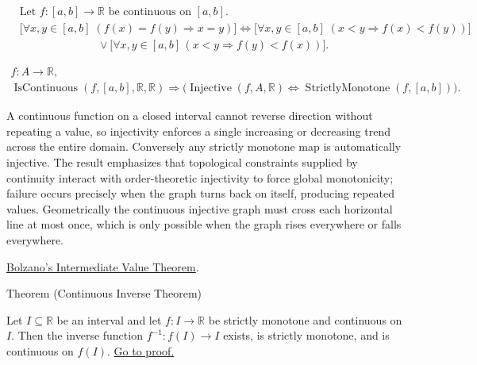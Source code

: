\begin{remark*}
\[
\begin{aligned}
&\text{Let } f:[a,b]\to\mathbb{R} \text{ be continuous on } [a,b].\\
&\bigl[\forall x,y\in[a,b]\;(f(x)=f(y)\Rightarrow x=y)\bigr] \Longleftrightarrow
\bigl[\forall x,y\in[a,b]\;(x<y\Rightarrow f(x)<f(y))\bigr]\\
&\qquad\qquad\qquad\quad\lor
\bigl[\forall x,y\in[a,b]\,(x<y\Rightarrow f(y)<f(x))\bigr].
\end{aligned}
\]
\end{remark*}

\begin{remark*}
\[
\begin{aligned}
  f\colon A\to\mathbb{R},\\
\operatorname{IsContinuous}(f,[a,b],\mathbb{R},\mathbb{R}) \Longrightarrow
\bigl(\operatorname{Injective}(f,A,\mathbb{R}) \Longleftrightarrow
\operatorname{StrictlyMonotone}(f,[a,b])\bigr).
\end{aligned}
\]
\end{remark*}

\begin{remark*}[Interpretation]
A continuous function on a closed interval cannot reverse direction without repeating a value, so injectivity enforces a single increasing or decreasing trend across the entire domain. Conversely any strictly monotone map is automatically injective. The result emphasizes that topological constraints supplied by continuity interact with order-theoretic injectivity to force global monotonicity; failure occurs precisely when the graph turns back on itself, producing repeated values. Geometrically the continuous injective graph must cross each horizontal line at most once, which is only possible when the graph rises everywhere or falls everywhere.
\end{remark*}

\begin{dependencies}
\hyperref[thm:bolzano-intermediate-value]{Bolzano's Intermediate Value Theorem}.
\end{dependencies}

\begin{theorembox}{Theorem (Continuous Inverse Theorem)}
\begin{theorem}
\label{thm:continuous-inverse-theorem}
Let $I\subseteq\mathbb{R}$ be an interval and let $f:I\to\mathbb{R}$ be strictly monotone and continuous on $I$. Then the inverse function $f^{-1}:f(I)\to I$ exists, is strictly monotone, and is continuous on $f(I)$.
\hyperref[prf:continuous-inverse-theorem]{Go to proof.}
\end{theorem}
\end{theorembox}

